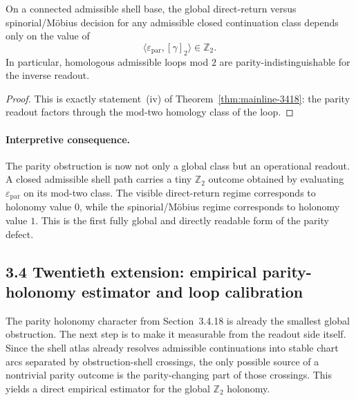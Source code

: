 \begin{corollary}
\label{cor:mainline-3418}
On a connected admissible shell base, the global direct-return versus spinorial/M\"obius decision for any admissible closed continuation class depends only on the value of
\[
  \langle \varepsilon_{\mathrm{par}},[\gamma]_2\rangle\in\mathbb Z_2.
\]
In particular, homologous admissible loops mod $2$ are parity-indistinguishable for the inverse readout.
\end{corollary}

\begin{proof}
This is exactly statement~(iv) of Theorem~\ref{thm:mainline-3418}: the parity readout factors through the mod-two homology class of the loop.
\end{proof}

\paragraph{Interpretive consequence.}
The parity obstruction is now not only a global class but an operational readout. A closed admissible shell path carries a tiny $\mathbb Z_2$ outcome obtained by evaluating $\varepsilon_{\mathrm{par}}$ on its mod-two class. The visible direct-return regime corresponds to holonomy value $0$, while the spinorial/M\"obius regime corresponds to holonomy value $1$. This is the first fully global and directly readable form of the parity defect.



\subsection*{3.4 Twentieth extension: empirical parity-holonomy estimator and loop calibration}
The parity holonomy character from Section~3.4.18 is already the smallest global obstruction. The next step is to make it measurable from the readout side itself. Since the shell atlas already resolves admissible continuations into stable chart arcs separated by obstruction-shell crossings, the only possible source of a nontrivial parity outcome is the parity-changing part of those crossings. This yields a direct empirical estimator for the global $\mathbb Z_2$ holonomy.

